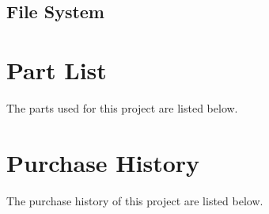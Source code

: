 \documentclass[titlepage,12pt,letter]{report}
\numberwithin{equation}{chapter}
\begin{document}
\begin{appendices}
\section{File System}



\chapter{Part List}
The parts used for this project are listed below.


\chapter{Purchase History}
The purchase history of this project are listed below.




\end{appendices}
\end{document}
